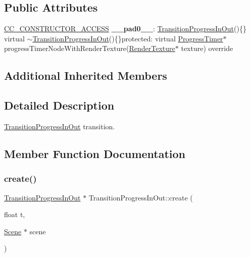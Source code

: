 \subsection*{Public Attributes}
\begin{DoxyCompactItemize}
\item 
\mbox{\label{classTransitionProgressInOut_aa5c2eda43c8ce758181486c9610547ac}} 
\hyperlink{_2cocos2d_2cocos_2base_2ccConfig_8h_a25ef1314f97c35a2ed3d029b0ead6da0}{C\+C\+\_\+\+C\+O\+N\+S\+T\+R\+U\+C\+T\+O\+R\+\_\+\+A\+C\+C\+E\+SS} {\bfseries \+\_\+\+\_\+pad0\+\_\+\+\_\+}\+: \hyperlink{classTransitionProgressInOut}{Transition\+Progress\+In\+Out}()\{\} virtual $\sim$\hyperlink{classTransitionProgressInOut}{Transition\+Progress\+In\+Out}()\{\}protected\+: virtual \hyperlink{classProgressTimer}{Progress\+Timer}$\ast$ progress\+Timer\+Node\+With\+Render\+Texture(\hyperlink{classRenderTexture}{Render\+Texture}$\ast$ texture) override
\end{DoxyCompactItemize}
\subsection*{Additional Inherited Members}


\subsection{Detailed Description}
\hyperlink{classTransitionProgressInOut}{Transition\+Progress\+In\+Out} transition. 

\subsection{Member Function Documentation}
\mbox{\label{classTransitionProgressInOut_a44fb367bb7367c0a53dbcca615cc28bf}} 
\subsubsection{\texorpdfstring{create()}{create()}\hspace{0.1cm}{\footnotesize\ttfamily [1/2]}}
{\footnotesize\ttfamily \hyperlink{classTransitionProgressInOut}{Transition\+Progress\+In\+Out} $\ast$ Transition\+Progress\+In\+Out\+::create (\begin{DoxyParamCaption}\item[{float}]{t,  }\item[{\hyperlink{classScene}{Scene} $\ast$}]{scene }\end{DoxyParamCaption})\hspace{0.3cm}{\ttfamily [static]}}

